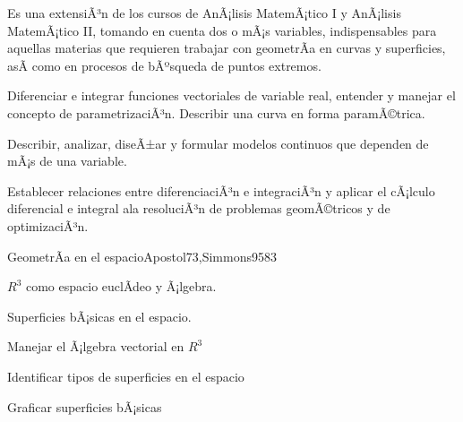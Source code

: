 
\begin{syllabus}


\begin{justification}
Es una extensiÃ³n de los cursos de AnÃ¡lisis MatemÃ¡tico I y AnÃ¡lisis MatemÃ¡tico II, tomando en cuenta dos o mÃ¡s variables, indispensables para aquellas materias que requieren trabajar con geometrÃ­a en curvas y superficies, asÃ­ como en procesos de bÃºsqueda de puntos extremos.
\end{justification}

\begin{goals}
\item Diferenciar e integrar funciones vectoriales de variable real, entender y manejar el concepto de parametrizaciÃ³n. Describir una curva en forma paramÃ©trica.
\item Describir, analizar, diseÃ±ar y formular modelos continuos que dependen de mÃ¡s de una variable.
\item Establecer relaciones entre diferenciaciÃ³n e integraciÃ³n y aplicar el cÃ¡lculo diferencial e integral ala resoluciÃ³n de problemas geomÃ©tricos y de optimizaciÃ³n.
\end{goals}

\begin{outcomes}
\end{outcomes}

\begin{unit}{GeometrÃ­a en el espacio}{Apostol73,Simmons95}{8}{3}
   \begin{topics}
      \item $R^3$ como espacio euclÃ­deo y Ã¡lgebra.
      \item Superficies bÃ¡sicas en el espacio.
   \end{topics}

   \begin{unitgoals}
      \item Manejar el Ã¡lgebra vectorial en $R^3$
      \item Identificar tipos de superficies en el espacio
      \item Graficar superficies bÃ¡sicas
      \end{unitgoals}
\end{unit}


\end{syllabus}
